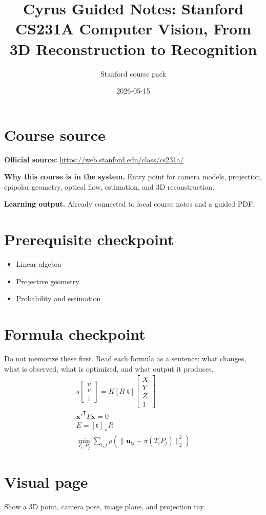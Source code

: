 \documentclass[11pt]{article}
\title{Cyrus Guided Notes: Stanford CS231A Computer Vision, From 3D Reconstruction to Recognition}
\author{Stanford course pack}
\date{2026-05-15}
\begin{document}
\maketitle

\section*{Course source}
\textbf{Official source:} \url{https://web.stanford.edu/class/cs231a/}

\textbf{Why this course is in the system.} Entry point for camera models, projection, epipolar geometry, optical flow, estimation, and 3D reconstruction.

\textbf{Learning output.} Already connected to local course notes and a guided PDF.

\section*{Prerequisite checkpoint}
\begin{itemize}[leftmargin=1.4em]
  \item Linear algebra
  \item Projective geometry
  \item Probability and estimation
\end{itemize}

\section*{Formula checkpoint}
Do not memorize these first. Read each formula as a sentence: what changes, what is observed, what is optimized, and what output it produces.
\begin{align*}
  s\begin{bmatrix}u\\v\\1\end{bmatrix}=K[R\;\bm{t}]\begin{bmatrix}X\\Y\\Z\\1\end{bmatrix}\\
  \bm{x}'^{\mathsf T}F\bm{x}=0\\
  E=[\bm{t}]_{\times}R\\
  \min_{T_i,P_j}\sum_{i,j}\rho(\|\bm{u}_{ij}-\pi(T_iP_j)\|_2^2)
\end{align*}

\section*{Visual page}
Show a 3D point, camera pose, image plane, and projection ray.
\end{document}
